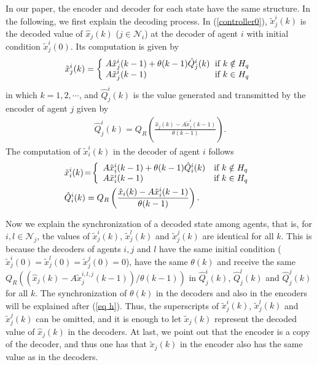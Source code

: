 \documentclass[letterpaper,journal,final,twocolumn]{IEEEtran}
\begin{document}
In our paper, the encoder and decoder for each state have the same structure. In the following, we first explain the decoding process. 
In (\ref{controller0}), $\tilde{x}_j^i(k)$ is the decoded value of $\hat x_j(k)$ ($j\in \mathcal N_i$) at the decoder of agent $i$ with initial condition $\tilde{x}_j^i(0)$. Its computation is given by
\begin{eqnarray}\setlength{\arraycolsep}{3pt}  \label{eq estimator i}
	\tilde x_j ^ i(k)
	=
	\left\{
	\begin{array}{ll}
		A  \tilde x_j ^ i(k-1) + \theta(k-1) \hat Q_j ^ i (k)  & \text{if $k \notin H_q$ } \\
		A\tilde x_j ^ i (k-1)               & \text{if $k \in  H_q$} 
	\end{array}
	\right.
\end{eqnarray}
in which $k=1, 2, \cdots$, and $\hat{Q}_j^i(k)$ is the value generated and transmitted by the encoder of agent $j$ given by 
\begin{eqnarray}\label{Q_i i}
	\hat  Q_j ^i (k) = Q_R \left(\frac{\hat x_j(k) -  A \tilde x_j ^ i (k-1)}{\theta(k-1)}  \right).
\end{eqnarray} 
The computation of $\tilde x _ i ^ i(k) $ in the decoder of agent $i$ follows
\begin{align}\setlength{\arraycolsep}{3pt}  
&	\tilde x_i ^ i(k)
	\!=\!
	\left\{
	\begin{array}{ll}
		A  \tilde x_i ^ i(k-1) + \theta(k-1) \hat Q_i ^ i (k)  & \text{if $k \notin H_q$ } \\
		A\tilde x_i ^ i (k-1)               & \text{if $k \in  H_q$} 
	\end{array}
	\right. \label{10}  \\
& 	\hat  Q_i ^i (k) = Q_R \left(\frac{\hat x_i(k) -  A \tilde x_i ^ i (k-1)}{\theta(k-1)}  \right). \label{11} 
\end{align}

Now we explain the synchronization of a decoded state among agents, that is, for $i, l \in \mathcal N _ j$, the values of $\tilde x_j ^ i (k)$, $\tilde x_j ^ l (k)$ and $\tilde x_j ^ j (k)$ are identical for all $k$. This is because the decoders of agents $i, j$ and $l$ have the same initial condition ($\tilde x_j ^ i (0)=\tilde x_j ^ l (0)=\tilde x_j ^ j (0)=0$), have the same $\theta(k)$ and receive the same $Q_R ( (\hat x_j(k) -  A \tilde x_j ^ {i, l, j} (k-1))/\theta(k-1) )$ in $\hat Q_{j} ^ i (k)$,  $\hat Q_{j} ^ l (k)$ and $\hat Q_{j} ^ j (k)$ for all $k$. The synchronization of $\theta(k)$ in the decoders and also in the encoders will be explained after (\ref{eq h}). Thus, the superscripts of $\tilde x_j ^ i (k)$, $\tilde x_j ^ l (k)$ and $\tilde x_j ^ j (k)$  can be omitted, and it is enough to let $\tilde x_j(k)$ represent the decoded value of $\hat x_j (k)$ in the decoders. At last, we point out that the encoder is a copy of the decoder, and thus one has that $\tilde x_j (k)$ in the encoder also has the same value as in the decoders.  
\end{document}
